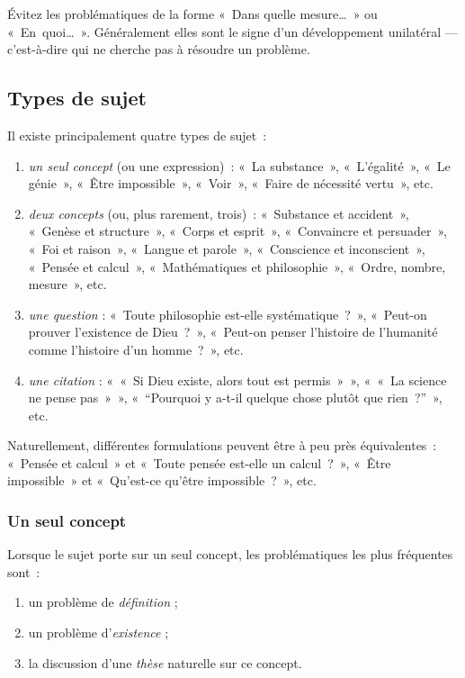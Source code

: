 \documentclass[a4paper,12pt]{article}
\begin{document}
Évitez les problématiques de la forme « Dans quelle mesure\ldots{} » ou
« En quoi\ldots{} ». Généralement elles sont le signe d'un développement
unilatéral — c'est-à-dire qui ne cherche pas à résoudre un problème.

\subsection{Types de sujet}
\label{sec-2-3}

Il existe principalement quatre types de sujet :

\begin{enumerate}
\item \emph{un seul concept} (ou une expression) : « La substance », « L'égalité »,
« Le génie », « Être impossible », « Voir », « Faire de nécessité vertu »,
etc.

\item \emph{deux concepts} (ou, plus rarement, trois) : « Substance et
accident », « Genèse et structure », « Corps et esprit »,
« Convaincre et persuader », « Foi et raison », « Langue et parole »,
« Conscience et inconscient », « Pensée et calcul », « Mathématiques
et philosophie », « Ordre, nombre, mesure », etc.

\item \emph{une question} : « Toute philosophie est-elle systématique ? »,
« Peut-on prouver l'existence de Dieu ? », « Peut-on penser l'histoire
de l'humanité comme l'histoire d'un homme ? », etc.

\item \emph{une citation} : « « Si Dieu existe, alors tout est permis » »,
« « La science ne pense pas » », « ``Pourquoi y a-t-il quelque chose
plutôt que rien ?'' », etc.
\end{enumerate}

Naturellement, différentes formulations peuvent être à peu près
équivalentes : « Pensée et calcul » et « Toute pensée est-elle un
calcul ? », « Être impossible » et « Qu'est-ce qu'être impossible ? », etc.

\subsubsection{Un seul concept}
\label{sec-2-3-1}

Lorsque le sujet porte sur un seul concept, les problématiques les plus
fréquentes sont :

\begin{enumerate}
\item un problème de \emph{définition} ;

\item un problème d'\emph{existence} ;

\item la discussion d'une \emph{thèse} naturelle sur ce concept.
\end{enumerate}
\end{document}

